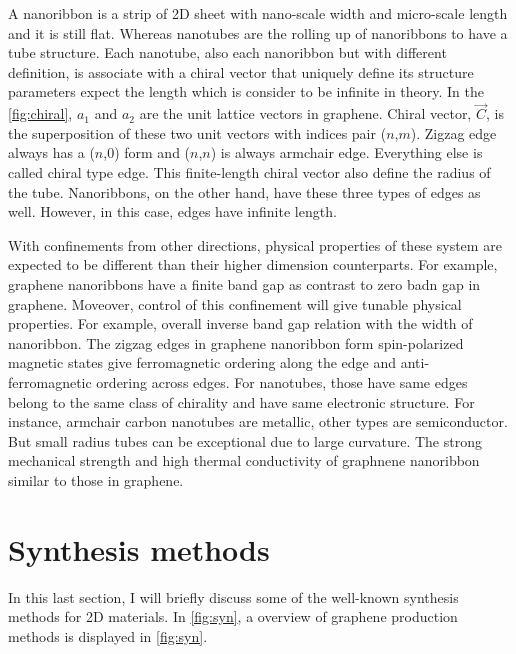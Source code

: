 A nanoribbon is a strip of 2D sheet with nano-scale width and micro-scale length and it is still flat. Whereas nanotubes are the rolling up of nanoribbons to have a tube structure. Each nanotube, also each nanoribbon but with different definition, is associate with a chiral vector that uniquely define its structure parameters expect the length which is consider to be infinite in theory. In the \autoref{fig:chiral}, $a_1$ and $a_2$ are the unit lattice vectors in graphene.  Chiral vector, $\vec{C}$, is the superposition of these two unit vectors with indices pair ($n$,$m$). Zigzag edge always has a ($n$,0) form and ($n$,$n$) is always armchair edge. Everything else is called chiral type edge.  This finite-length chiral vector also define the radius of the tube. Nanoribbons, on the other hand, have these three types of edges as well. However, in this case, edges have infinite length. 

With confinements from other directions, physical properties of these system are expected to be different than their higher dimension counterparts. For example, graphene nanoribbons have a finite band gap as contrast to zero badn gap in graphene\cite{Wang2008}. Moveover, control of this confinement will give tunable physical properties. For example, overall inverse band gap relation with the width of nanoribbon\cite{Han2007}. The zigzag edges in graphene nanoribbon form spin-polarized magnetic states give ferromagnetic ordering along the edge and anti-ferromagnetic ordering across edges\cite{Son2006}. For nanotubes, those have same edges belong to the same class of chirality and have same electronic structure. For instance, armchair carbon nanotubes are metallic, other types are semiconductor. But small radius tubes can be exceptional due to large curvature\cite{Bandaru2007}.  The strong mechanical strength and high thermal conductivity of graphnene nanoribbon similar to those in graphene.

\section{Synthesis methods}

In this last section, I will briefly discuss some of the well-known synthesis methods for 2D materials. In \autoref{fig:syn}, a overview of graphene production methods is displayed in \autoref{fig:syn}. 

